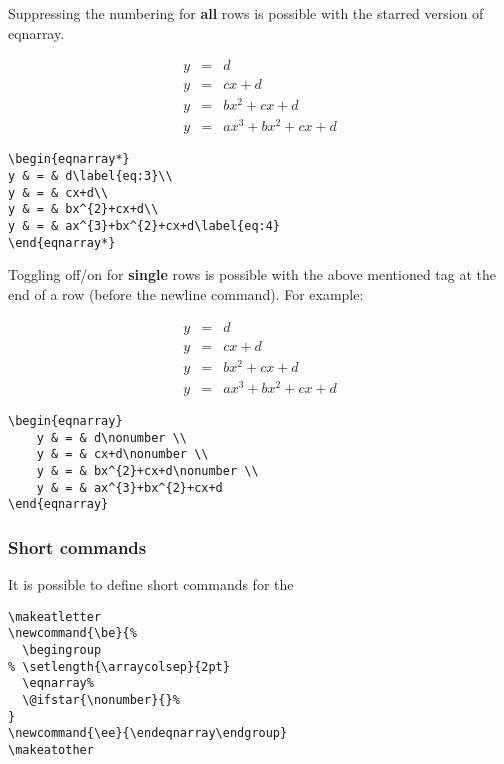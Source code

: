 \medskip
Suppressing the  numbering for \textbf{all} rows is possible with the starred version of eqnarray.

\medskip
\begin{minipage}{0.45\columnwidth}
\begin{eqnarray*}
y & = & d\label{eq:3}\\
y & = & cx+d\\
y & = & bx^{2}+cx+d\\
y & = & ax^{3}+bx^{2}+cx+d\label{eq:4}
\end{eqnarray*}
\end{minipage}
\begin{minipage}{0.53\columnwidth}
\begin{lstlisting}
\begin{eqnarray*}
y & = & d\label{eq:3}\\
y & = & cx+d\\
y & = & bx^{2}+cx+d\\
y & = & ax^{3}+bx^{2}+cx+d\label{eq:4}
\end{eqnarray*}
\end{lstlisting}
\end{minipage}

\medskip
Toggling off/on for \textbf{single} rows is possible with the above
mentioned  tag at the end of a row
(before the newline command). For example:

\medskip
\begin{minipage}{0.45\columnwidth}
\begin{eqnarray}
	y & = & d\nonumber \\
	y & = & cx+d\nonumber \\
	y & = & bx^{2}+cx+d\nonumber \\
	y & = & ax^{3}+bx^{2}+cx+d
\end{eqnarray}
\end{minipage}
\begin{minipage}{0.53\columnwidth}
\begin{lstlisting}
\begin{eqnarray}
	y & = & d\nonumber \\
	y & = & cx+d\nonumber \\
	y & = & bx^{2}+cx+d\nonumber \\
	y & = & ax^{3}+bx^{2}+cx+d
\end{eqnarray}
\end{lstlisting}
\end{minipage}


\subsubsection{Short commands}\label{subsec:shortcommand}
It is possible to define short commands for the 
%
\begin{lstlisting}
\makeatletter
\newcommand{\be}{%
  \begingroup
% \setlength{\arraycolsep}{2pt}
  \eqnarray%
  \@ifstar{\nonumber}{}%
}
\newcommand{\ee}{\endeqnarray\endgroup}
\makeatother
\end{lstlisting}

